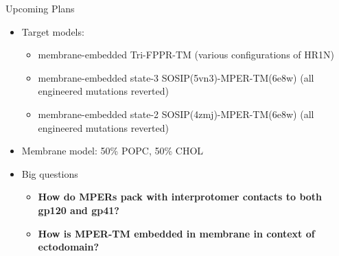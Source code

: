 \begin{frame}[fragile]{Upcoming Plans}
    \begin{itemize}
        \item Target models:
        \begin{itemize}
            \item membrane-embedded Tri-FPPR-TM (various configurations of HR1N)
            \item membrane-embedded state-3 SOSIP(5vn3)-MPER-TM(6e8w) (all engineered mutations reverted)
            \item membrane-embedded state-2 SOSIP(4zmj)-MPER-TM(6e8w) (all engineered mutations reverted)
        \end{itemize}
        \item Membrane model: 50\% POPC, 50\% CHOL
        \item Big questions
        \begin{itemize}
            \item {\bf How do MPERs pack with interprotomer contacts to both gp120 and gp41?}
            \item {\bf How is MPER-TM embedded in membrane in context of ectodomain?}
        \end{itemize}
    \end{itemize}
\end{frame}

